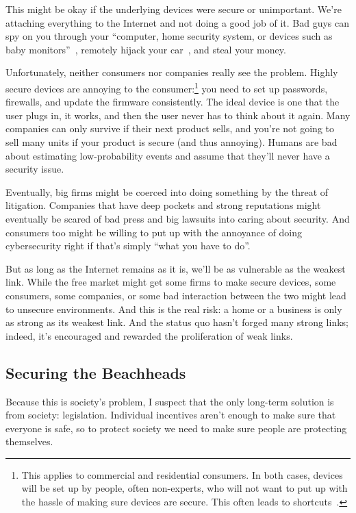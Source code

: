 This might be okay if the underlying devices were secure or
unimportant.
%
We're attaching everything to the Internet and not doing
a good job of it.
%
Bad guys can spy on you through your ``computer, home security system,
or devices such as baby monitors''~\citep{andrews-15}, remotely hijack
your car~\citep{miller-15}, and steal your money.

Unfortunately, neither consumers nor companies really see the problem.
Highly secure devices are annoying to the consumer:\footnote{This
  applies to commercial and residential consumers.  In both cases,
  devices will be set up by people, often non-experts, who will not
  want to put up with the hassle of making sure devices are secure.
  This often leads to shortcuts~\citep{}.}  you need to set up
passwords, firewalls, and update the firmware consistently.  The ideal
device is one that the user plugs in, it works, and then the user
never has to think about it again.
%
Many companies can only survive if
their next product sells, and you're not going to sell many units if
your product is secure (and thus annoying).
%
Humans are bad about
estimating low-probability events and assume that they'll never have a
security issue.


Eventually, big firms might be coerced into doing something by the
threat of litigation.  Companies that have deep pockets and strong
reputations might eventually be scared of bad press and big lawsuits
into caring about security.  And consumers too might be willing to put
up with the annoyance of doing cybersecurity right if that's simply
``what you have to do''.

But as long as the Internet remains as it is, we'll be as vulnerable
as the weakest link.  While the free market might get some firms to
make secure devices, some consumers, some companies, or some bad
interaction between the two might lead to unsecure environments.  And
this is the real risk: a home or a business is only as strong as its
weakest link.  And the status quo hasn't forged many strong links;
indeed, it's encouraged and rewarded the proliferation of weak links.

\subsection{Securing the Beachheads}

Because this is society's problem, I suspect that the only long-term
solution is from society: legislation.  Individual incentives aren't
enough to make sure that everyone is safe, so to protect society we
need to make sure people are protecting themselves.

